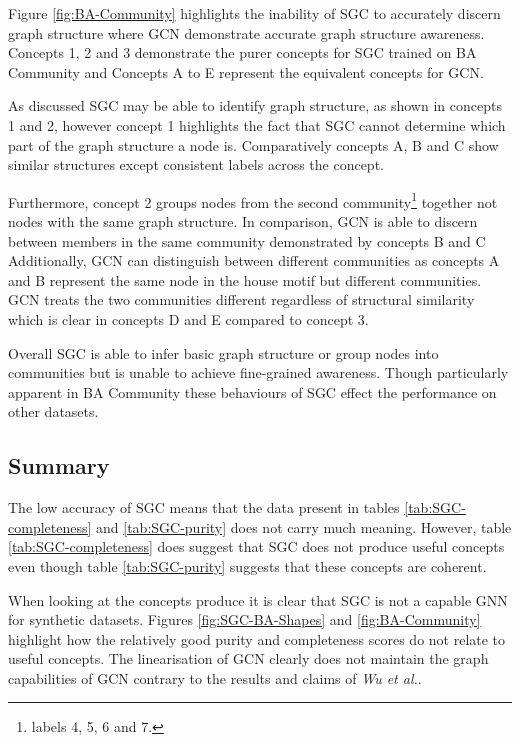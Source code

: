 Figure \ref{fig:BA-Community} highlights the inability of SGC to accurately discern graph structure where GCN demonstrate accurate graph structure awareness.
Concepts 1, 2 and 3 demonstrate the purer concepts for SGC trained on BA Community and Concepts A to E represent the equivalent concepts for GCN.

As discussed SGC may be able to identify graph structure, as shown in concepts 1 and 2, however concept 1 highlights the fact that SGC cannot determine which part of the graph structure a node is.
Comparatively concepts A, B and C show similar structures except consistent labels across the concept.

Furthermore, concept 2 groups nodes from the second community\footnote{labels 4, 5, 6 and 7.} together not nodes with the same graph structure.
In comparison, GCN is able to discern between members in the same community demonstrated by concepts B and C
Additionally, GCN can distinguish between different communities as concepts A and B represent the same node in the house motif but different communities.
GCN treats the two communities different regardless of structural similarity which is clear in concepts D and E compared to concept 3.

Overall SGC is able to infer basic graph structure or group nodes into communities but is unable to achieve fine-grained awareness.
Though particularly apparent in BA Community these behaviours of SGC effect the performance on other datasets.

\subsection{Summary}
The low accuracy of SGC means that the data present in tables \ref{tab:SGC-completeness} and \ref{tab:SGC-purity} does not carry much meaning.
However, table \ref{tab:SGC-completeness} does suggest that SGC does not produce useful concepts even though table \ref{tab:SGC-purity} suggests that these concepts are coherent.

When looking at the concepts produce it is clear that SGC is not a capable GNN for synthetic datasets.
Figures \ref{fig:SGC-BA-Shapes} and \ref{fig:BA-Community} highlight how the relatively good purity and completeness scores do not relate to useful concepts.
The linearisation of GCN clearly does not maintain the graph capabilities of GCN contrary to the results and claims of \textit{Wu et al.}.

